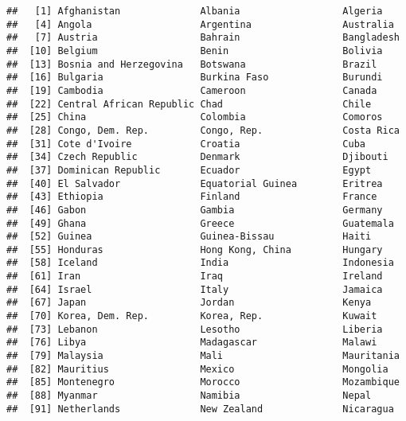 \documentclass[
]{article}
\begin{document}
\begin{verbatim}
##   [1] Afghanistan              Albania                  Algeria                 
##   [4] Angola                   Argentina                Australia               
##   [7] Austria                  Bahrain                  Bangladesh              
##  [10] Belgium                  Benin                    Bolivia                 
##  [13] Bosnia and Herzegovina   Botswana                 Brazil                  
##  [16] Bulgaria                 Burkina Faso             Burundi                 
##  [19] Cambodia                 Cameroon                 Canada                  
##  [22] Central African Republic Chad                     Chile                   
##  [25] China                    Colombia                 Comoros                 
##  [28] Congo, Dem. Rep.         Congo, Rep.              Costa Rica              
##  [31] Cote d'Ivoire            Croatia                  Cuba                    
##  [34] Czech Republic           Denmark                  Djibouti                
##  [37] Dominican Republic       Ecuador                  Egypt                   
##  [40] El Salvador              Equatorial Guinea        Eritrea                 
##  [43] Ethiopia                 Finland                  France                  
##  [46] Gabon                    Gambia                   Germany                 
##  [49] Ghana                    Greece                   Guatemala               
##  [52] Guinea                   Guinea-Bissau            Haiti                   
##  [55] Honduras                 Hong Kong, China         Hungary                 
##  [58] Iceland                  India                    Indonesia               
##  [61] Iran                     Iraq                     Ireland                 
##  [64] Israel                   Italy                    Jamaica                 
##  [67] Japan                    Jordan                   Kenya                   
##  [70] Korea, Dem. Rep.         Korea, Rep.              Kuwait                  
##  [73] Lebanon                  Lesotho                  Liberia                 
##  [76] Libya                    Madagascar               Malawi                  
##  [79] Malaysia                 Mali                     Mauritania              
##  [82] Mauritius                Mexico                   Mongolia                
##  [85] Montenegro               Morocco                  Mozambique              
##  [88] Myanmar                  Namibia                  Nepal                   
##  [91] Netherlands              New Zealand              Nicaragua               

\end{verbatim}
\end{document}
